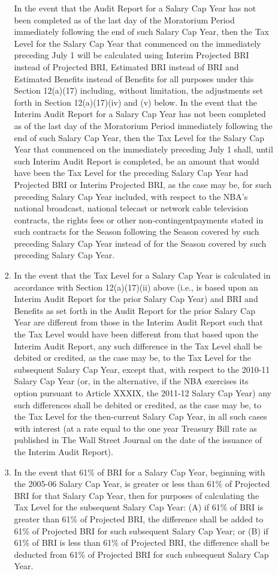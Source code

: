\documentclass[
]{book}
\begin{document}
\begin{enumerate}
\begin{enumerate}
\begin{enumerate}
      In the event that the Audit Report for a Salary Cap Year has not been completed as of the last day of the Moratorium Period immediately following the end of such Salary Cap Year, then the Tax Level for the Salary Cap Year that commenced on the immediately preceding July 1 will be calculated using Interim Projected BRI instead of Projected BRI, Estimated BRI instead of BRI and Estimated Benefits instead of Benefits for all purposes under this Section 12(a)(17) including, without limitation, the adjustments set forth in Section 12(a)(17)(iv) and (v) below. In the event that the Interim Audit Report for a Salary Cap Year has not been completed as of the last day of the Moratorium Period immediately following the end of such Salary Cap Year, then the Tax Level for the Salary Cap Year that commenced on the immediately preceding July 1 shall, until such Interim Audit Report is completed, be an amount that would have been the Tax Level for the preceding Salary Cap Year had Projected BRI or Interim Projected BRI, as the case may be, for such preceding Salary Cap Year included, with respect to the NBA's national broadcast, national telecast or network cable television contracts, the rights fees or other non-contingentpayments stated in such contracts for the Season following the Season covered by such preceding Salary Cap Year instead of for the Season covered by such preceding Salary Cap Year.
    \item
      In the event that the Tax Level for a Salary Cap Year is calculated in accordance with Section 12(a)(17)(ii) above (i.e., is based upon an Interim Audit Report for the prior Salary Cap Year) and BRI and Benefits as set forth in the Audit Report for the prior Salary Cap Year are different from those in the Interim Audit Report such that the Tax Level would have been different from that based upon the Interim Audit Report, any such difference in the Tax Level shall be debited or credited, as the case may be, to the Tax Level for the subsequent Salary Cap Year, except that, with respect to the 2010-11 Salary Cap Year (or, in the alternative, if the NBA exercises its option pursuant to Article XXXIX, the 2011-12 Salary Cap Year) any such differences shall be debited or credited, as the case may be, to the Tax Level for the then-current Salary Cap Year, in all such cases with interest (at a rate equal to the one year Treasury Bill rate as published in The Wall Street Journal on the date of the issuance of the Interim Audit Report).
    \item
      In the event that 61\% of BRI for a Salary Cap Year, beginning with the 2005-06 Salary Cap Year, is greater or less than 61\% of Projected BRI for that Salary Cap Year, then for purposes of calculating the Tax Level for the subsequent Salary Cap Year: (A) if 61\% of BRI is greater than 61\% of Projected BRI, the difference shall be added to 61\% of Projected BRI for such subsequent Salary Cap Year; or (B) if 61\% of BRI is less than 61\% of Projected BRI, the difference shall be deducted from 61\% of Projected BRI for such subsequent Salary Cap Year.

\end{enumerate}
\end{enumerate}
\end{enumerate}
\end{document}
